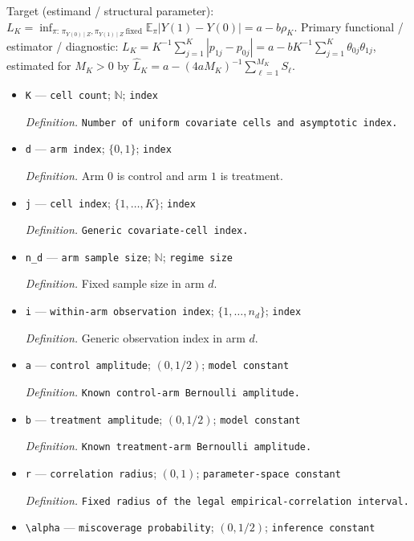 \documentclass{article}
\begin{document}
Target (estimand / structural parameter): \(L_K=\inf_{\pi:\,\pi_{Y(0)\mid Z},\pi_{Y(1)\mid Z}\ \mathrm{fixed}}\mathbb E_\pi|Y(1)-Y(0)|=a-b\rho_K\).
Primary functional / estimator / diagnostic: \(L_K=K^{-1}\sum_{j=1}^{K}|p_{1j}-p_{0j}|=a-bK^{-1}\sum_{j=1}^{K}\theta_{0j}\theta_{1j}\), estimated for \(M_K>0\) by \(\widehat L_K=a-(4aM_K)^{-1}\sum_{\ell=1}^{M_K}S_\ell\).
\begin{itemize}
  \item \texttt{K} --- \texttt{cell count}; \(\mathbb N\); \texttt{index}
  \par\smallskip\noindent\emph{Definition.} \texttt{Number of uniform covariate cells and asymptotic index.}
  \item \texttt{d} --- \texttt{arm index}; \(\{0,1\}\); \texttt{index}
  \par\smallskip\noindent\emph{Definition.} Arm \(0\) is control and arm \(1\) is treatment.
  \item \texttt{j} --- \texttt{cell index}; \(\{1,\ldots,K\}\); \texttt{index}
  \par\smallskip\noindent\emph{Definition.} \texttt{Generic covariate-\allowbreak{}cell index.}
  \item \texttt{n\_\allowbreak{}d} --- \texttt{arm sample size}; \(\mathbb N\); \texttt{regime size}
  \par\smallskip\noindent\emph{Definition.} Fixed sample size in arm \(d\).
  \item \texttt{i} --- \texttt{within-\allowbreak{}arm observation index}; \(\{1,\ldots,n_d\}\); \texttt{index}
  \par\smallskip\noindent\emph{Definition.} Generic observation index in arm \(d\).
  \item \texttt{a} --- \texttt{control amplitude}; \((0,1/2)\); \texttt{model constant}
  \par\smallskip\noindent\emph{Definition.} \texttt{Known control-\allowbreak{}arm Bernoulli amplitude.}
  \item \texttt{b} --- \texttt{treatment amplitude}; \((0,1/2)\); \texttt{model constant}
  \par\smallskip\noindent\emph{Definition.} \texttt{Known treatment-\allowbreak{}arm Bernoulli amplitude.}
  \item \texttt{r} --- \texttt{correlation radius}; \((0,1)\); \texttt{parameter-\allowbreak{}space constant}
  \par\smallskip\noindent\emph{Definition.} \texttt{Fixed radius of the legal empirical-\allowbreak{}correlation interval.}
  \item \texttt{\textbackslash{}\allowbreak{}alpha} --- \texttt{miscoverage probability}; \((0,1/2)\); \texttt{inference constant}

\end{itemize}
\end{document}
